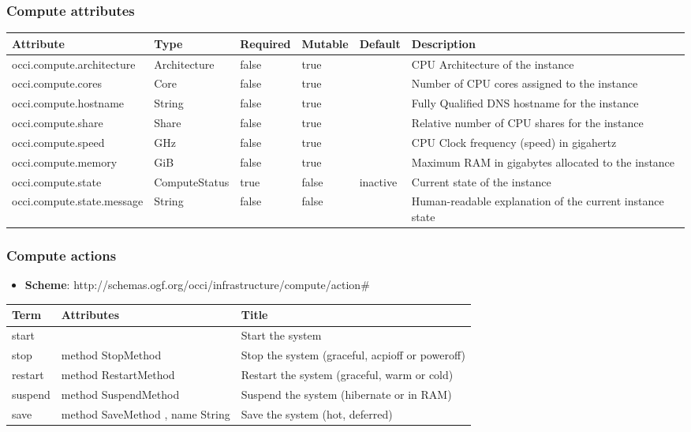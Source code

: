 \documentclass{article}
\begin{document}
\subsubsection{Compute attributes}
\begin{tabularx}{\textwidth}{|l|l|p{1.4cm}|p{1.3cm}|l|X|}
  \hline
  \textbf{Attribute} & \textbf{Type} & \textbf{Required} & \textbf{Mutable} & \textbf{Default} & \textbf{Description} \\
  \hline  
  occi.compute.architecture & Architecture & false & true &  & CPU Architecture of the instance \\
  \hline
  occi.compute.cores & Core & false & true &  & Number of CPU cores assigned to the instance \\
  \hline
  occi.compute.hostname & String & false & true &  & Fully Qualified DNS hostname for the instance \\
  \hline
  occi.compute.share & Share & false & true &  & Relative number of CPU shares for the instance \\
  \hline
  occi.compute.speed & GHz & false & true &  & CPU Clock frequency (speed) in gigahertz \\
  \hline
  occi.compute.memory & GiB & false & true &  & Maximum RAM in gigabytes allocated to the instance \\
  \hline
  occi.compute.state & ComputeStatus & true & false & inactive & Current state of the instance \\
  \hline
  occi.compute.state.message & String & false & false &  & Human-readable explanation of the current instance state \\
  \hline
\end{tabularx}

\subsubsection{Compute actions}
\begin{itemize}
	\item \textbf{Scheme}: http://schemas.ogf.org/occi/infrastructure/compute/action\#
\end{itemize}
\begin{tabularx}{\textwidth}{|l|l|X|}
  \hline
  \textbf{Term}  & \textbf{Attributes} & \textbf{Title} \\
  \hline  
  start & & Start the system \\
  \hline
  stop &  method StopMethod & Stop the system (graceful, acpioff or poweroff) \\
  \hline
  restart &  method RestartMethod & Restart the system (graceful, warm or cold) \\
  \hline
  suspend &  method SuspendMethod & Suspend the system (hibernate or in RAM) \\
  \hline
  save &  method SaveMethod , name String & Save the system (hot, deferred) \\
  \hline
\end{tabularx}
\end{document}
